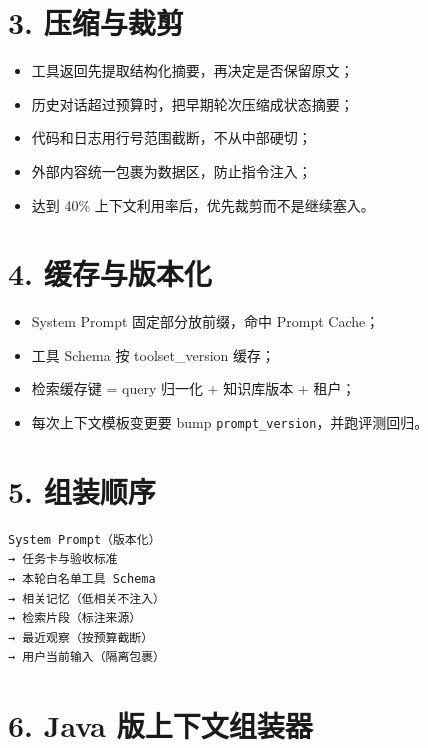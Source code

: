 \documentclass[9pt,a4paper,twocolumn]{ctexart}
\begin{document}
\section*{3. 压缩与裁剪}

\begin{itemize}[itemsep=1pt, topsep=2pt]
  \item 工具返回先提取结构化摘要，再决定是否保留原文；
  \item 历史对话超过预算时，把早期轮次压缩成状态摘要；
  \item 代码和日志用行号范围截断，不从中部硬切；
  \item 外部内容统一包裹为数据区，防止指令注入；
  \item 达到 40\% 上下文利用率后，优先裁剪而不是继续塞入。
\end{itemize}


\section*{4. 缓存与版本化}

\begin{itemize}[itemsep=1pt, topsep=2pt]
  \item System Prompt 固定部分放前缀，命中 Prompt Cache；
  \item 工具 Schema 按 toolset\_version 缓存；
  \item 检索缓存键 = query 归一化 + 知识库版本 + 租户；
  \item 每次上下文模板变更要 bump \texttt{prompt\_version}，并跑评测回归。
\end{itemize}


\section*{5. 组装顺序}


\begin{lstlisting}
System Prompt（版本化）
→ 任务卡与验收标准
→ 本轮白名单工具 Schema
→ 相关记忆（低相关不注入）
→ 检索片段（标注来源）
→ 最近观察（按预算截断）
→ 用户当前输入（隔离包裹）
\end{lstlisting}



\section*{6. Java 版上下文组装器}
\end{document}

